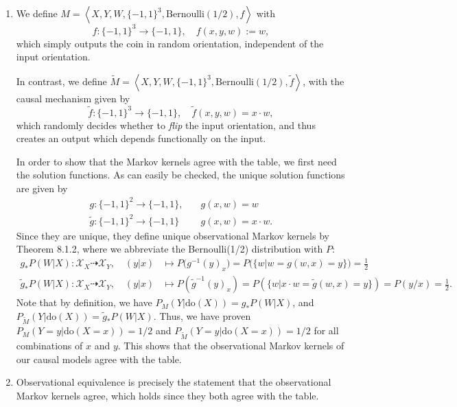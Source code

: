 \begin{enumerate}
\begin{gradedsolution}
\begin{enumerate}
	\item We define $M = \left\langle X, Y, W, \{-1,1\}^3, \text{Bernoulli}(1/2), f \right\rangle$ with 
	\begin{equation*}
		f: \{-1,1\}^3 \to \{-1,1\}, \quad f(x, y, w) := w,
	\end{equation*}
	which simply outputs the coin in random orientation, independent of the input orientation.

	In contrast, we define $\tilde{M} = \left\langle X, Y, W, \{-1,1\}^3, \text{Bernoulli}(1/2), \tilde{f} \right\rangle$, with the causal mechanism given by
	\begin{equation*}
		\tilde{f}: \{-1,1\}^3 \to \{-1,1\}, \quad \tilde{f}(x, y, w) = x \cdot w,
	\end{equation*}
	which randomly decides whether to \emph{flip} the input orientation, and thus creates an output which depends functionally on the input.

	In order to show that the Markov kernels agree with the table, we first need the solution functions. 
	As can easily be checked, the unique solution functions are given by
	\begin{align*}
		g: \{-1,1\}^2 \to \{-1,1\}, & \quad g(x, w) = w \\
		\tilde{g}: \{-1,1\}^2 \to \{-1,1\} & \quad g(x, w) = x \cdot w.
	\end{align*}
	Since they are unique, they define unique observational Markov kernels by Theorem 8.1.2, where we abbreviate the Bernoulli(1/2) distribution with $P$:
	\begin{align*}
		g_{*}P(W | X): \mathcal{X}_X \dashrightarrow \mathcal{X}_Y, \quad (y | x) & \mapsto P\big(g^{-1}(y)_x\big) = P\big(\{w | w = g(w,x) = y\}\big) = \frac{1}{2} \\
		\tilde{g}_{*}P(W | X): \mathcal{X}_X \dashrightarrow \mathcal{X}_Y, \quad (y | x) & \mapsto P\left(\tilde{g}^{-1}(y)_x\right) = P\left(\{w | x \cdot w = \tilde{g}(w, x) = y \}\right) = P\left(y/x\right) = \frac{1}{2}.
	\end{align*}
	Note that by definition, we have $P_{M}(Y | \text{do}(X)) = g_{*}P(W | X)$, and $P_{\tilde{M}}(Y | \text{do}(X)) = \tilde{g}_{*}P(W | X)$.
	Thus, we have proven $P_{M}(Y = y | \text{do}(X = x)) = 1/2$ and $P_{\tilde{M}}(Y = y | \text{do}(X = x)) = 1/2$ for all combinations of $x$ and $y$.
	This shows that the observational Markov kernels of our causal models agree with the table.
	\item Observational equivalence is precisely the statement that the observational Markov kernels agree, which holds since they both agree with the table.


\end{enumerate}
\end{gradedsolution}
\end{enumerate}

